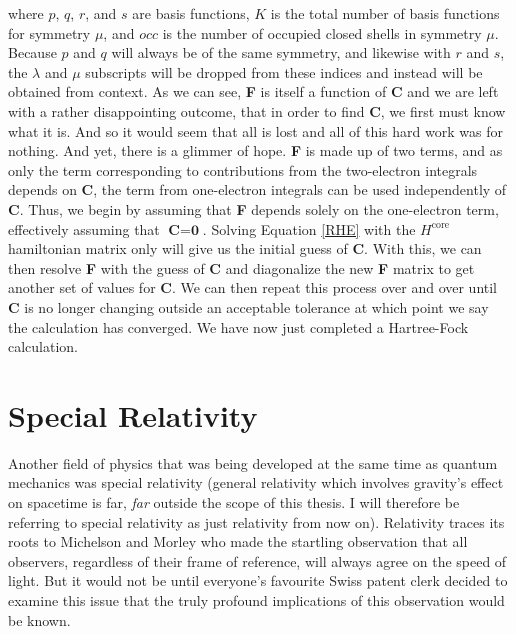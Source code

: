 where $p$, $q$, $r$, and $s$ are basis functions, $K$ is the total number of basis functions for symmetry $\mu$, and $occ$ is the number of occupied closed shells in symmetry $\mu$. Because $p$ and $q$ will always be of the same symmetry, and likewise with $r$ and $s$, the $\lambda$ and $\mu$ subscripts will be dropped from these indices and instead will be obtained from context. As we can see, \textbf{F} is itself a function of \textbf{C} and we are left with a rather disappointing outcome, that in order to find \textbf{C}, we first must know what it is. And so it would seem that all is lost and all of this hard work was for nothing. And yet, there is a glimmer of hope. \textbf{F} is made up of two terms, and as only the term corresponding to contributions from the two-electron integrals depends on \textbf{C}, the term from one-electron integrals can be used independently of \textbf{C}. Thus, we begin by assuming that \textbf{F} depends solely on the one-electron term, effectively assuming that $\textbf{C}=\textbf{0}$. Solving Equation \ref{RHE} with the $H^{\text{core}}$ hamiltonian matrix only will give us the initial guess of \textbf{C}. With this, we can then resolve \textbf{F} with the guess of \textbf{C} and diagonalize the new \textbf{F} matrix to get another set of values for \textbf{C}. We can then repeat this process over and over until \textbf{C} is no longer changing outside an acceptable tolerance at which point we say the calculation has converged. We have now just completed a Hartree-Fock calculation.

\section{Special Relativity}
Another field of physics that was being developed at the same time as quantum mechanics was special relativity (general relativity which involves gravity's effect on spacetime is far, \textit{far} outside the scope of this thesis. I will therefore be referring to special relativity as just relativity from now on). Relativity traces its roots to Michelson and Morley\cite{Michelson} who made the startling observation that all observers, regardless of their frame of reference, will always agree on the speed of light. But it would not be until everyone's favourite Swiss patent clerk decided to examine this issue that the truly profound implications of this observation would be known. 

